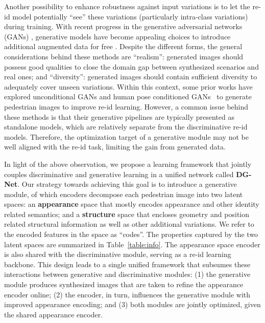 \documentclass[10pt,twocolumn,letterpaper]{article}
\begin{document}
Another possibility to enhance robustness against input variations is to let the re-id model potentially ``see'' these variations (particularly intra-class variations) during training. With recent progress in the generative adversarial networks (GANs) \cite{goodfellow2014generative}, generative models have become appealing choices to introduce additional augmented data for free \cite{zheng2017unlabeled}. Despite the different forms, the general considerations behind these methods are ``realism'': generated images should possess good qualities to close the domain gap between synthesized scenarios and real ones; and ``diversity'': generated images should contain sufficient diversity to adequately cover unseen variations. 
Within this context, some prior works have explored unconditional GANs and human pose conditioned GANs~\cite{zheng2017unlabeled, huang2018multi, qian2017pose, ge2018fdgan, liu2018pose} to generate pedestrian images to improve re-id learning. 
However, a common issue behind these methods is that their generative pipelines are typically presented as standalone models, which are relatively separate from the discriminative re-id models. Therefore, the optimization target of a generative module may not be well aligned with the re-id task, limiting the gain from generated data.

In light of the above observation, we propose a learning framework that jointly couples discriminative and generative learning in a unified network called \textbf{DG-Net}. Our strategy towards achieving this goal is to introduce a generative module, of which encoders decompose each pedestrian image into two latent spaces: an \textbf{appearance} space that mostly encodes appearance and other identity related semantics; and a \textbf{structure} space that encloses geometry and position related structural information as well as other additional variations. We refer to the encoded features in the space as ``codes''. The properties captured by the two latent spaces are summarized in Table~\ref{table:info}. The appearance space encoder is also shared with the discriminative module, serving as a re-id learning backbone. This design leads to a single unified framework that subsumes these interactions between generative and discriminative modules: (1) the generative module produces synthesized images that are taken to refine the appearance encoder online; (2) the encoder, in turn, influences the generative module with improved appearance encoding; and (3) both modules are jointly optimized, given the shared appearance encoder.
\end{document}
